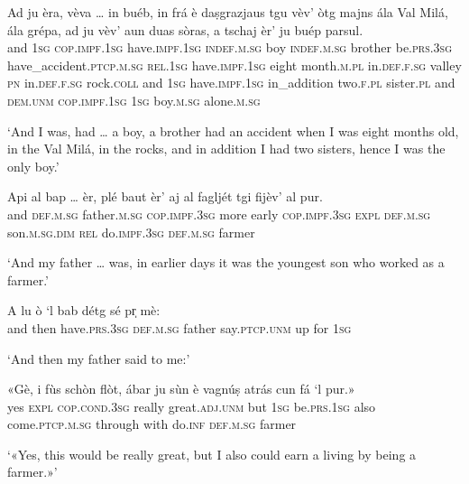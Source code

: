 \begin{linenumbers}
\gll    Ad ju èra, vèva … in buéb, in frá è daṣgrazjaus tgu vèv’ òtg majns ála Val Milá, ála grépa, ad ju vèv' aun duas sòras, a tschaj  èr' ju buép parsul. \\
and \textsc{1sg} \textsc{cop.impf.1sg} have.\textsc{impf.1sg} {} \textsc{indef.m.sg} boy \textsc{indef.m.sg} brother  be.\textsc{prs.3sg} have\_accident.\textsc{ptcp.m.sg} \textsc{rel.1sg} have.\textsc{impf.1sg} eight month.\textsc{m.pl} in.\textsc{def.f.sg} valley \textsc{pn} in.\textsc{def.f.sg} rock.\textsc{coll} and \textsc{1sg} have.\textsc{impf.1sg} in\_addition two.\textsc{f.pl} sister.\textsc{pl} and \textsc{dem.unm}  \textsc{cop.impf.1sg} \textsc{1sg} boy.\textsc{m.sg} alone.\textsc{m.sg}\\
\end{linenumbers}
\medskip
\glt `And I was, had … a boy, a brother had an accident when I was eight months old, in the Val Milá, in the rocks, and in addition I had two sisters, hence I was the only boy.'
\medskip

\begin{linenumbers}
\gll  Api al bap … èr, plé baut èr’ aj al fagljét tgi fijèv’ al pur. \\
and \textsc{def.m.sg} father.\textsc{m.sg} {}  \textsc{cop.impf.3sg} more early \textsc{cop.impf.3sg} \textsc{expl} \textsc{def.m.sg}  son.\textsc{m.sg.dim} \textsc{rel} do.\textsc{impf.3sg} \textsc{def.m.sg} farmer \\
\end{linenumbers}
\medskip
\glt `And my father … was, in earlier days it was the youngest son who worked as a farmer.'
\medskip


\begin{linenumbers}
\gll   A lu ò `l bab détg sé pr̩ mè: \\
and then have.\textsc{prs.3sg} \textsc{def.m.sg} father say.\textsc{ptcp.unm} up for \textsc{1sg}\\
\end{linenumbers}
\medskip
\glt `And then my father said to me:'
\medskip

\begin{linenumbers}
\gll   «Gè, i fùs schòn flòt, ábar ju sùn è vagnúṣ atrás cun fá `l pur.» \\
yes \textsc{expl} \textsc{cop.cond.3sg} really great.\textsc{adj.unm} but \textsc{1sg}  be.\textsc{prs.1sg} also  come.\textsc{ptcp.m.sg} through with  do.\textsc{inf} \textsc{def.m.sg} farmer\\
\end{linenumbers}
\medskip
\glt `«Yes, this would be really great, but I also could earn a living by being a farmer.»'
\medskip

